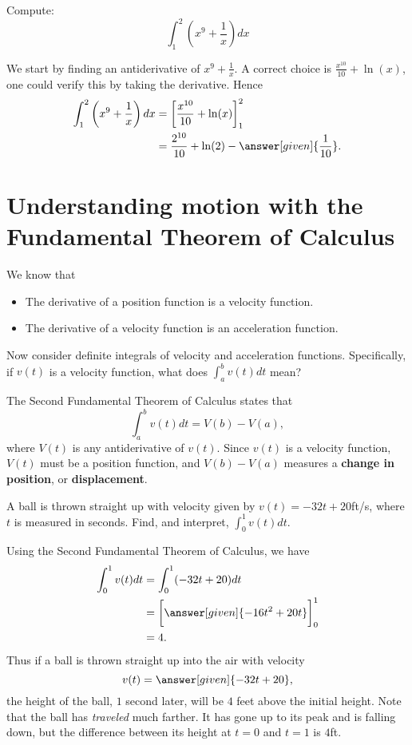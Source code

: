 \documentclass{ximera}
\begin{document}
\begin{example}
Compute:
\[
\int_1^2\left(x^9 + \frac{1}{x}\right) dx
\]
\begin{explanation}
We start by finding an antiderivative of $x^9 + \frac{1}{x}$.  A
correct choice is $\frac{x^{10}}{10} + \ln(x)$, one could verify this
by taking the derivative. Hence
\begin{align*}
\int_1^2\left(x^9 + \frac{1}{x}\right) dx &= \bigg[ \frac{x^{10}}{10} + \ln(x) \bigg]_1^2 \\
&= \frac{2^{10}}{10} + \ln(2) - \answer[given]{\frac{1}{10}}.
\end{align*}
\end{explanation}
\end{example}




\section{Understanding motion with the Fundamental Theorem of Calculus}

We know that
\begin{itemize}
\item The derivative of a position function is a velocity function.
\item The derivative of a velocity function is an acceleration
  function.
\end{itemize}
Now consider definite integrals of velocity and acceleration
functions. Specifically, if $v(t)$ is a velocity function, what does
$\int_a^b v(t) dt$ mean?

The Second Fundamental Theorem of Calculus states that
\[
\int_a^b v(t) dt = V(b) - V(a),
\]
where $V(t)$ is any antiderivative of $v(t)$. Since $v(t)$ is a
velocity function, $V(t)$ must be a position function, and $V(b) -
V(a)$ measures a \textbf{change in position}, or \textbf{displacement}.

\begin{example}
  A ball is thrown straight up with velocity given by $v(t) =
  -32t+20$ft/s, where $t$ is measured in seconds. Find, and interpret,
  $\int_0^1 v(t) dt$.
    \begin{explanation}
      Using the Second Fundamental Theorem of Calculus, we have
      \begin{align*}
        \int_0^1 v(t) dt &= \int_0^1 (-32t+20) dt \\
	&= \bigg[ \answer[given]{-16t^2 + 20t} \bigg]_0^1 \\
	&= 4.
      \end{align*}
      Thus if a ball is thrown straight up into the air with velocity
      \[
      v(t) = \answer[given]{-32t+20},
      \]
      the height of the ball, $1$ second later, will be $4$ feet above the
      initial height. Note that the ball has \textit{traveled} much
      farther. It has gone up to its peak and is falling down, but the
      difference between its height at $t=0$ and $t=1$ is $4$ft. 
    \end{explanation}
\end{example}    
\end{document}
